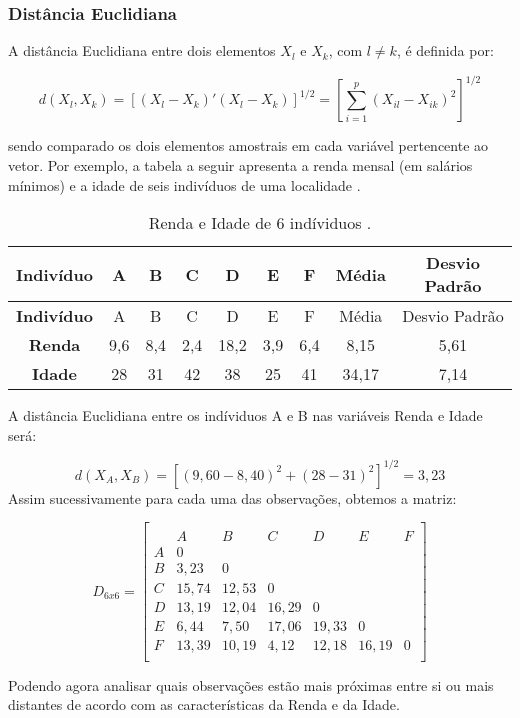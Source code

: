 \documentclass[
  openany]{book}
\begin{document}
\hypertarget{disteuclidana}{%
\subsubsection{Distância Euclidiana}\label{disteuclidana}}

A distância Euclidiana entre dois elementos \(X_l\) e \(X_k\), com \(l \neq k\), é definida por:

\begin{equation} 
  d(X_l,X_k)=[(X_l-X_k)'(X_l - X_k)]^{1/2}=[\displaystyle \sum^p_{i=1}(X_{il}-X_{ik})^2]^{1/2}
  \label{eq:euclidiana}
\end{equation}

sendo comparado os dois elementos amostrais em cada variável pertencente ao vetor. Por exemplo, a tabela a seguir apresenta a renda mensal (em salários mínimos) e a idade de seis indivíduos de uma localidade \citep{mingoti2007analise}.

\begin{longtable}[]{@{}ccccccccc@{}}
\caption{\label{tab:dadossrendaa} Renda e Idade de 6 indíviduos \citep{mingoti2007analise}.}\tabularnewline
\toprule
\textbf{Indivíduo} & A & B & C & D & E & F & Média & Desvio Padrão\tabularnewline
\midrule
\endfirsthead
\toprule
\textbf{Indivíduo} & A & B & C & D & E & F & Média & Desvio Padrão\tabularnewline
\midrule
\endhead
\textbf{Renda} & 9,6 & 8,4 & 2,4 & 18,2 & 3,9 & 6,4 & 8,15 & 5,61\tabularnewline
\textbf{Idade} & 28 & 31 & 42 & 38 & 25 & 41 & 34,17 & 7,14\tabularnewline
\bottomrule
\end{longtable}

A distância Euclidiana entre os indíviduos A e B nas variáveis Renda e Idade será:

\[d(X_A,X_B)=[(9,60-8,40)^2+(28-31)^2]^{1/2}=3,23\]
Assim sucessivamente para cada uma das observações, obtemos a matriz:

\[D_{6x6}=\begin{bmatrix}\\
 &A&B&C&D&E&F \\
 A&0&&&&&\\
 B&3,23&0&&&&\\
 C & 15,74& 12,53&0&&&\\
 D& 13,19& 12,04& 16,29&0&&\\
 E& 6,44& 7,50& 17,06& 19,33&0&\\
 F& 13,39& 10,19& 4,12& 12,18& 16,19&0 \\
\end{bmatrix}\]

Podendo agora analisar quais observações estão mais próximas entre si ou mais distantes de acordo com as características da Renda e da Idade.
\end{document}

